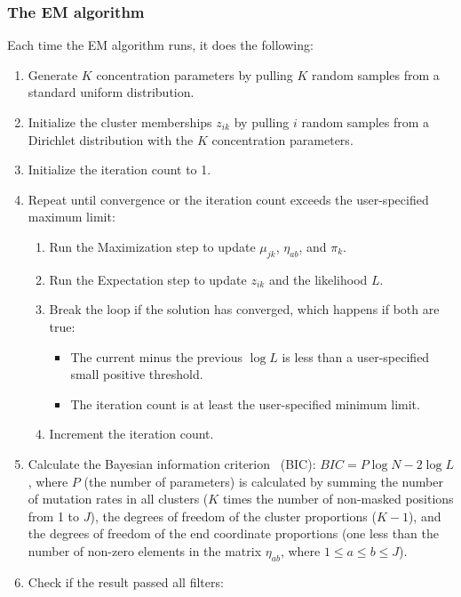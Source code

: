 \documentclass{article}
\begin{document}
\subsubsection{The EM algorithm}
\label{em-algorithm}

Each time the EM algorithm runs, it does the following:
\begin{enumerate}
    \item Generate $K$ concentration parameters by pulling $K$ random samples from a standard uniform distribution.
    \item Initialize the cluster memberships $z_{ik}$ by pulling $i$ random samples from a Dirichlet distribution with the $K$ concentration parameters.
    \item Initialize the iteration count to 1.
    \item Repeat until convergence or the iteration count exceeds the user-specified maximum limit:
    \begin{enumerate}
        \item Run the Maximization step to update $\mu_{jk}$, $\eta_{ab}$, and $\pi_k$.
        \item Run the Expectation step to update $z_{ik}$ and the likelihood $L$.
        \item Break the loop if the solution has converged, which happens if both are true:
        \begin{itemize}
            \item The current minus the previous $\log{L}$ is less than a user-specified small positive threshold.
            \item The iteration count is at least the user-specified minimum limit.
        \end{itemize}
        \item Increment the iteration count.
    \end{enumerate}
    \item Calculate the Bayesian information criterion~\cite{Schwarz1978} (BIC): $BIC = P\log{N} - 2\log{L}$, where $P$ (the number of parameters) is calculated by summing the number of mutation rates in all clusters ($K$ times the number of non-masked positions from 1 to $J$), the degrees of freedom of the cluster proportions ($K - 1$), and the degrees of freedom of the end coordinate proportions (one less than the number of non-zero elements in the matrix $\eta_{ab}$, where $1 \le a \le b \le J$).
    \item Check if the result passed all filters:
    \begin{description}

\end{description}
\end{enumerate}
\end{document}
